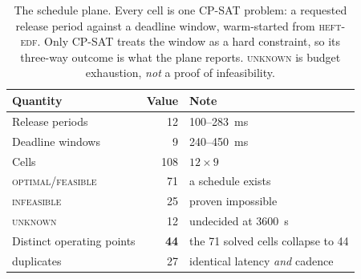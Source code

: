 \begin{table}[t]
\centering
\caption{The schedule plane.  Every cell is one CP-SAT problem: a requested
release period against a deadline window, warm-started from \textsc{heft-edf}.
Only CP-SAT treats the window as a hard constraint, so its three-way outcome
is what the plane reports.  \textsc{unknown} is budget exhaustion, \emph{not}
a proof of infeasibility.}
\label{tab:plane}
\small
\begin{tabular}{lr l}
\toprule
Quantity & Value & Note \\
\midrule
Release periods            & 12  & 100--\SI{283}{\milli\second} \\
Deadline windows           & 9   & 240--\SI{450}{\milli\second} \\
Cells                      & 108 & $12\times9$ \\
\midrule
\textsc{optimal}/\textsc{feasible} & 71 & a schedule exists \\
\textsc{infeasible}        & 25  & proven impossible \\
\textsc{unknown}           & 12  & undecided at \SI{3600}{\second} \\
\midrule
Distinct operating points  & \textbf{44} & the 71 solved cells collapse to 44 \\
\quad duplicates           & 27  & identical latency \emph{and} cadence \\
\bottomrule
\end{tabular}
\end{table}

